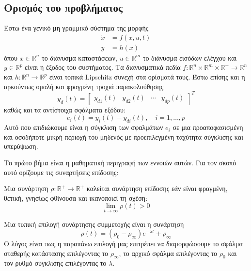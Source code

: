 \subsection{Ορισμός του προβλήματος}
Έστω ένα γενικό μη γραμμικό σύστημα της μορφής 
\begin{equation}
\begin{split}
\dot{x} &= f(x,u,t) \\
y &= h(x)
\end{split}
\label{eq:general_nonlinear_sys}
\end{equation}
όπου $x \in \mathbb{R}^n$ το διάνυσμα καταστάσεων, $ u\in \mathbb{R}^m$ το διάνυσμα εισόδων ελέγχου και $y \in \mathbb{R}^p$ είναι η έξοδος του συστήματος. Τα διανυσματικά πεδία $f: \mathbb{R}^n \times \mathbb{R}^m \times \mathbb{R}^+ \rightarrow \mathbb{R}^n$ και $h:\mathbb{R}^n \rightarrow \mathbb{R}^p$ είναι τοπικά Lipschitz συνεχή στα ορίσματά τους. Έστω επίσης και η αρκούντως ομαλή και φραγμένη τροχιά παρακολούθησης
\begin{equation*}
	y_d(t) = \begin{bmatrix}
		y_{d1}(t) & y_{d2}(t) & \cdots & y_{dp}(t)
	\end{bmatrix}^T
\end{equation*}
καθώς και τα αντίστοιχα σφάλματα εξόδου:
\begin{equation*}
	e_i(t) = y_i(t) - y_{di}(t), \quad i = 1,\dots ,p
\end{equation*}
Αυτό που επιδιώκουμε είναι η σύγκλιση των σφαλμάτων $e_i$ σε μια προαποφασισμένη και οσοδήποτε μικρή περιοχή του μηδενός με προεπιλεγμένη ταχύτητα σύγκλισης και υπερύψωση.

Το πρώτο βήμα είναι η μαθηματική περιγραφή των εννοιών αυτών. Για τον σκοπό αυτό ορίζουμε τις συναρτήσεις επίδοσης:\\

\begin{definition}
	Μια συνάρτηση $\rho: \mathbb{R}^+ \rightarrow \mathbb{R}^+$ καλείται συνάρτηση επίδοσης εάν είναι φραγμένη, θετική, γνησίως φθίνουσα και ικανοποιεί τη σχέση:
	\begin{equation*}
	\lim\limits_{t \rightarrow \infty} \rho(t) > 0
	\end{equation*} 
\end{definition} 

Μια τυπική επιλογή συνάρτησης συμμετοχής είναι η συνάρτηση
\begin{equation}
	\rho(t) = ( \rho_0 - \rho_{\infty} ) e^{-\lambda t} + \rho_{\infty}
	\label{eq:exp_perf}
\end{equation}
Ο λόγος είναι πως η παραπάνω επιλογή μας επιτρέπει να διαμορφώσουμε το σφάλμα σταθερής κατάστασης επιλέγοντας το $\rho_{\infty}$, το αρχικό σφάλμα επιλέγοντας το $\rho_0$ και τον ρυθμό σύγκλισης επιλέγοντας το $\lambda$.


